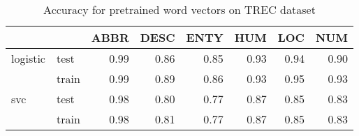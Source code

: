 \begin{table}[h]
\begin{center}

\begin{tabular}{llrrrrrr}
\toprule
 &&ABBR &DESC &ENTY &HUM &LOC &NUM \\
\midrule
logistic & test &0.99 &0.86 &0.85 & 0.93 & 0.94 & 0.90 \\
 & train &0.99 &0.89 &0.86 & 0.93 & 0.95 & 0.93 \\
svc & test &0.98 &0.80 &0.77 & 0.87 & 0.85 & 0.83 \\
 & train &0.98 &0.81 &0.77 & 0.87 & 0.85 & 0.83 \\
\bottomrule
\end{tabular}

\caption[Accuracy for pretrained word vectors on TREC dataset]{Accuracy for pretrained word vectors on TREC dataset}
\label{tab:}
\end{center}
\end{table}





